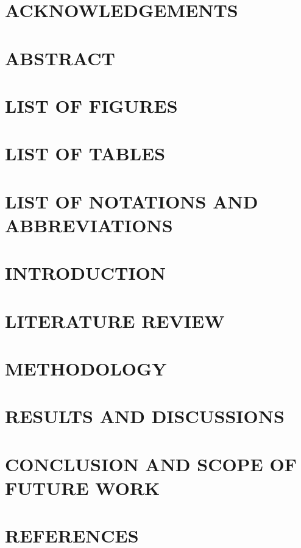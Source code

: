 \documentclass[12pt,twoside]{report}
\title{\thesistitle}
\begin{document}



\titleformat{\chapter}[display]{\bfseries\centering}{\large}{1em}{\large}
\newpage
{}
\chapter*{ACKNOWLEDGEMENTS}

\newpage
{}
\chapter*{ABSTRACT}

\tableofcontents
\newpage
{}
\chapter*{LIST OF FIGURES}

\newpage
{}
\chapter*{LIST OF TABLES}

\newpage
{}
\chapter*{LIST OF NOTATIONS AND ABBREVIATIONS}


\chapter{INTRODUCTION}
\setcounter{page}{1}


\chapter{LITERATURE REVIEW}


\chapter{METHODOLOGY}


\chapter{RESULTS AND DISCUSSIONS}

\chapter{CONCLUSION AND SCOPE OF FUTURE WORK}

\chapter{REFERENCES}

\newpage

\end{document}
